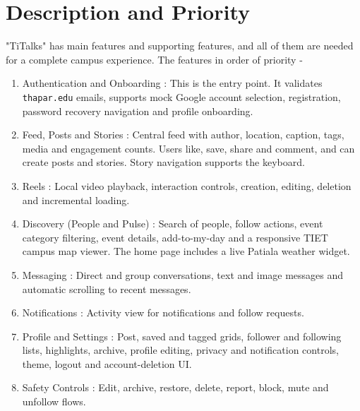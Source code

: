 \documentclass{scrreprt}
\begin{document}
\section{Description and Priority}
"TiTalks" has main features and supporting features, and all of them are needed for a complete campus experience.
\newline
The features in order of priority -
\begin{enumerate}
    \item Authentication and Onboarding : This is the entry point. It validates \texttt{thapar.edu} emails, supports mock Google account selection, registration, password recovery navigation and profile onboarding.
    \item Feed, Posts and Stories : Central feed with author, location, caption, tags, media and engagement counts. Users like, save, share and comment, and can create posts and stories. Story navigation supports the keyboard.
    \item Reels : Local video playback, interaction controls, creation, editing, deletion and incremental loading.
    \item Discovery (People and Pulse) : Search of people, follow actions, event category filtering, event details, add-to-my-day and a responsive TIET campus map viewer. The home page includes a live Patiala weather widget.
    \item Messaging : Direct and group conversations, text and image messages and automatic scrolling to recent messages.
    \item Notifications : Activity view for notifications and follow requests.
    \item Profile and Settings : Post, saved and tagged grids, follower and following lists, highlights, archive, profile editing, privacy and notification controls, theme, logout and account-deletion UI.
    \item Safety Controls : Edit, archive, restore, delete, report, block, mute and unfollow flows.
\end{enumerate}
\end{document}

